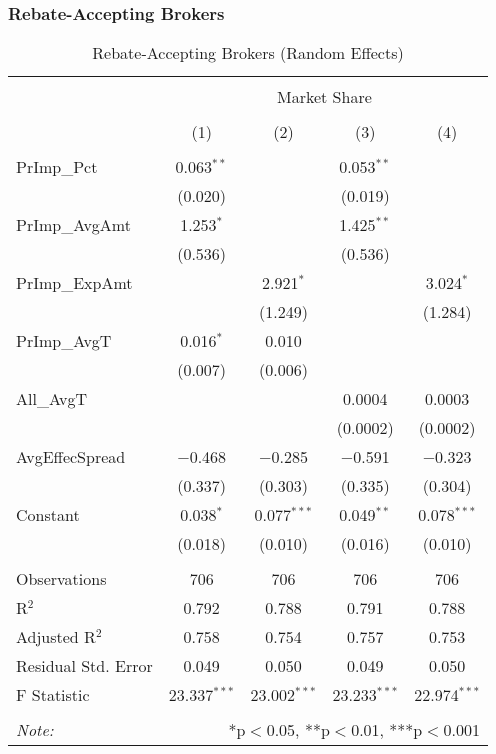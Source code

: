 \documentclass[12pt,a4paper]{article}
\begin{document}
		\pagebreak
		
		\subsubsection{Rebate-Accepting Brokers}

		\vspace{10em}
	
		\begin{table}[!htbp] \centering 
			\captionsetup{font=large}
			\caption{Rebate-Accepting Brokers (Random Effects)} 
			\label{} 
			\begin{tabular}{@{\extracolsep{1em}}lcccc} 
				\\[-1.8ex]\hline 
				\hline \\[-1.8ex] 
				& \multicolumn{4}{c}{Market Share} \\ 
				\cline{2-5} 
				\\[-1.8ex] & (1) & (2) & (3) & (4)\\ 
				\hline \\[-1.8ex] 
				PrImp\_Pct & 0.063$^{**}$ &  & 0.053$^{**}$ &  \\ 
				& (0.020) &  & (0.019) &  \\ 
				PrImp\_AvgAmt & 1.253$^{*}$ &  & 1.425$^{**}$ &  \\ 
				& (0.536) &  & (0.536) &  \\ 
				PrImp\_ExpAmt &  & 2.921$^{*}$ &  & 3.024$^{*}$ \\ 
				&  & (1.249) &  & (1.284) \\ 
				PrImp\_AvgT & 0.016$^{*}$ & 0.010 &  &  \\ 
				& (0.007) & (0.006) &  &  \\ 
				All\_AvgT &  &  & 0.0004 & 0.0003 \\ 
				&  &  & (0.0002) & (0.0002) \\ 
				AvgEffecSpread & $-$0.468 & $-$0.285 & $-$0.591 & $-$0.323 \\ 
				& (0.337) & (0.303) & (0.335) & (0.304) \\ 
				Constant & 0.038$^{*}$ & 0.077$^{***}$ & 0.049$^{**}$ & 0.078$^{***}$ \\ 
				& (0.018) & (0.010) & (0.016) & (0.010) \\ 
				\hline \\[-1.8ex] 
				Observations & 706 & 706 & 706 & 706 \\ 
				R$^{2}$ & 0.792 & 0.788 & 0.791 & 0.788 \\ 
				Adjusted R$^{2}$ & 0.758 & 0.754 & 0.757 & 0.753 \\ 
				Residual Std. Error & 0.049  & 0.050  & 0.049 & 0.050 \\ 
				F Statistic & 23.337$^{***}$ & 23.002$^{***}$ & 23.233$^{***}$ & 22.974$^{***}$ \\ 
				\hline 
				\hline \\[-1.8ex] 
				\textit{Note:}  & \multicolumn{4}{r}{*p$<$0.05, **p$<$0.01, ***p$<$0.001} \\ 
			\end{tabular} 
		\end{table} 
	
\end{document}
